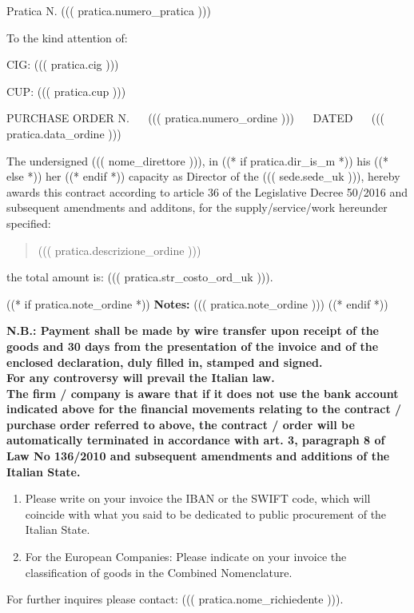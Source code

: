 \documentclass[a4paper,12pt]{letter}
\begin{document}
\topaddr

{\small Pratica N. ((( pratica.numero_pratica ))) }
\vspace{.4cm}

\begin{flushright}
\begin{minipage}{15cm}
To the kind attention of:\\
\end{minipage}
\end{flushright}
\vspace{5mm}

CIG: ((( pratica.cig ))) 

CUP: ((( pratica.cup )))

PURCHASE ORDER N. ~~ ((( pratica.numero_ordine ))) ~~ DATED ~~ ((( pratica.data_ordine )))

The undersigned ((( nome_direttore ))), in
((* if pratica.dir_is_m *))
his
((* else *))
her
((* endif *))
capacity as Director of the ((( sede.sede_uk ))), hereby
awards this contract according to 
article 36 of the Legislative Decree 50/2016
and subsequent amendments and additons,
for the supply/service/work hereunder specified:

\begin{quote}
((( pratica.descrizione_ordine )))
\end{quote}

the total amount is:   
((( pratica.str_costo_ord_uk ))).

((* if pratica.note_ordine *))
{\bf Notes:} ((( pratica.note_ordine )))
((* endif *))
\vspace{1cm}

{\tiny\bf N.B.:
Payment shall be made by wire transfer upon receipt of the goods and 30 days from the presentation of the invoice
and of the enclosed declaration, duly filled in, stamped and signed. \\
For any controversy will prevail the Italian law. \\
The firm / company is aware that if it does not use the bank account indicated above for the financial movements
relating to the contract / purchase order referred to above, the contract / order will be automatically terminated in
accordance with art. 3, paragraph 8 of Law No 136/2010 and subsequent amendments and additions of the Italian
State.
\begin{enumerate}
\item  Please write on your invoice the IBAN or the SWIFT code, which will coincide with what you said to be
dedicated to public procurement of the Italian State.
\item  For the European Companies: Please indicate on your invoice the classification of goods in the Combined
Nomenclature.
\end{enumerate}

For further inquires please contact: ((( pratica.nome_richiedente ))).
}
\end{document}
